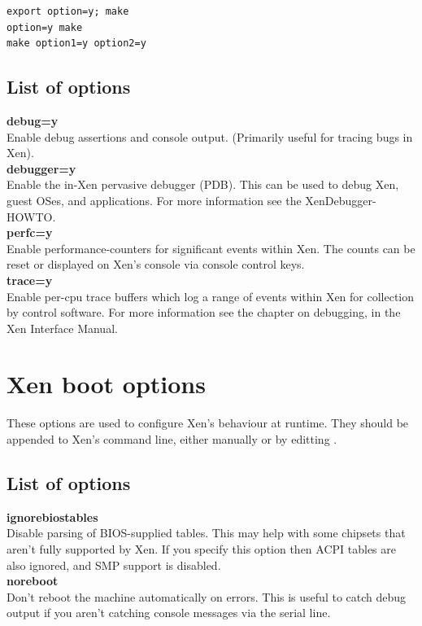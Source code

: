 \documentclass[11pt,twoside,final,openright]{xenstyle}
\begin{document}
\begin{verbatim}
export option=y; make
option=y make
make option1=y option2=y
\end{verbatim}

\section{List of options}

{\bf debug=y }\\
Enable debug assertions and console output.
(Primarily useful for tracing bugs in Xen).        \\
{\bf debugger=y }\\
Enable the in-Xen pervasive debugger (PDB).
This can be used to debug Xen, guest OSes, and
applications. For more information see the 
XenDebugger-HOWTO.                                 \\
{\bf perfc=y }\\
Enable performance-counters for significant events
within Xen. The counts can be reset or displayed
on Xen's console via console control keys.          \\
{\bf trace=y }\\
Enable per-cpu trace buffers which log a range of
events within Xen for collection by control
software.  For more information see the chapter on debugging,
in the Xen Interface Manual.

\chapter{Xen boot options}

These options are used to configure Xen's behaviour at runtime.  They
should be appended to Xen's command line, either manually or by
editting .

\section{List of options}

{\bf ignorebiostables }\\
 Disable parsing of BIOS-supplied tables. This may help with some
 chipsets that aren't fully supported by Xen. If you specify this
 option then ACPI tables are also ignored, and SMP support is
 disabled. \\

{\bf noreboot } \\
 Don't reboot the machine automatically on errors.  This is
 useful to catch debug output if you aren't catching console messages
 via the serial line. \\
\end{document}
